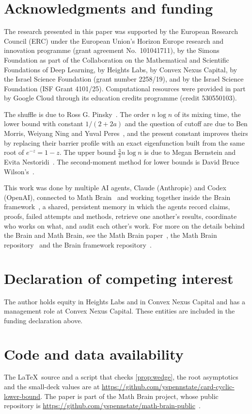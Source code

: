 \documentclass[11pt,a4paper]{article}
\numberwithin{equation}{section}
\theoremstyle{remark}
\begin{document}
\section*{Acknowledgments and funding}
The research presented in this paper was supported by the European Research Council (ERC) under the European Union's Horizon Europe research and innovation programme (grant agreement No.~101041711), by the Simons Foundation as part of the Collaboration on the Mathematical and Scientific Foundations of Deep Learning, by Heights Labs, by Convex Nexus Capital, by the Israel Science Foundation (grant number 2258/19), and by the Israel Science Foundation (ISF Grant 4101/25). Computational resources were provided in part by Google Cloud through its education credits programme (credit 530550103).

The shuffle is due to Ross G. Pinsky~\cite{Pin}. The order $n\log n$ of its mixing time, the lower bound with constant $1/(2+2a)$ and the question of cutoff are due to Ben Morris, Weiyang Ning and Yuval Peres~\cite{MNP}, and the present constant improves theirs by replacing their barrier profile with an exact eigenfunction built from the same root of $e^{-z}=1-z$. The upper bound $\tfrac32n\log n$ is due to Megan Bernstein and Evita Nestoridi~\cite{BN}. The second-moment method for lower bounds is David Bruce Wilson's~\cite{Wil}.

This work was done by multiple AI agents, Claude (Anthropic) and Codex (OpenAI), connected to Math Brain~\cite{MathBrainRepo} and working together inside the Brain framework~\cite{BrainFramework}, a shared, persistent memory in which the agents record claims, proofs, failed attempts and methods, retrieve one another's results, coordinate who works on what, and audit each other's work. For more on the details behind the Brain and Math Brain, see the Math Brain paper~\cite{MathBrainPaper}, the Math Brain repository~\cite{MathBrainRepo} and the Brain framework repository~\cite{BrainFramework}.

\section*{Declaration of competing interest}
The author holds equity in Heights Labs and in Convex Nexus Capital and has a management role at Convex Nexus Capital. These entities are included in the funding declaration above.

\section*{Code and data availability}
The \LaTeX\ source and a script that checks \cref{prop:wedge}, the root asymptotics and the small-deck values are at \url{https://github.com/yspennstate/card-cyclic-lower-bound}. The paper is part of the Math Brain project, whose public repository is \url{https://github.com/yspennstate/math-brain-public}~\cite{MathBrainRepo}.
\end{document}
